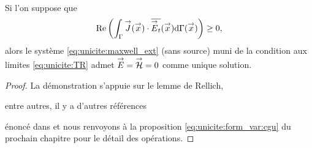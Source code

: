     \begin{prop}~\\
      Si l'on suppose que
      \begin{equation}
        \label{prop:cgu}
        \operatorname{Re}\left(\int_\Gamma {\overset{\rightarrow}{J}}({\overset{\rightarrow}{x}}) \cdot {\overline{{\overset{\rightarrow}{E}}_t}}({\overset{\rightarrow}{x}}) \mathrm{d}{\Gamma({\overset{\rightarrow}{x}})}\right) \ge 0,
      \end{equation}
      alors le système \eqref{eq:unicite:maxwell_ext} (sans source) muni de la condition aux limites \eqref{eq:unicite:TR} admet \({\overset{\rightarrow}{E}}={\overset{\rightarrow}{\mathcal{H}}}=0\) comme unique solution.
    \end{prop}
    
    \begin{proof}
      La démonstration s'appuie sur le lemme de Rellich,
      \begin{REM}
    entre autres, il y a d'autres références
\end{REM} énoncé dans \cite[p.~74]{cessenat_mathematical_1996} et nous renvoyons à la proposition \ref{eq:unicite:form_var:cgu} du prochain chapitre pour le détail des opérations.


      

\end{proof}
